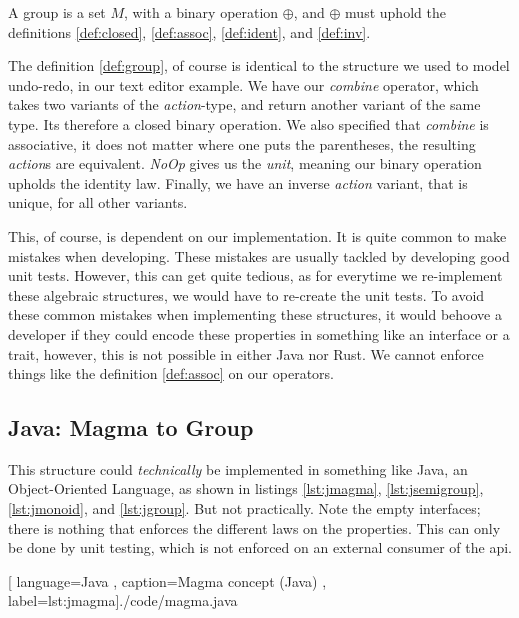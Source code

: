 \begin{definition}[Group] \label{def:group}
  A group is a set $M$, with a binary operation $\oplus$, and $\oplus$ must
  uphold the definitions \ref{def:closed}, \ref{def:assoc}, \ref{def:ident},
  and \ref{def:inv}.
\end{definition}

The definition \ref{def:group}, of course is identical to the structure we used
to model undo-redo, in our text editor example. We have our \textit{combine}
operator, which takes two variants of the \textit{action}-type, and return
another variant of the same type. Its therefore a closed binary operation. We
also specified that \textit{combine} is associative, it does not matter where one
puts the parentheses, the resulting \textit{action}s are equivalent.
\textit{NoOp} gives us the \textit{unit}, meaning our binary operation upholds
the identity law. Finally, we have an inverse \textit{action} variant, that is
unique, for all other variants.

This, of course, is dependent on our implementation. It is quite common to make
mistakes when developing. These mistakes are usually tackled by developing good
unit tests. However, this can get quite tedious, as for everytime we re-implement
these algebraic structures, we would have to re-create the unit tests. To avoid
these common mistakes when implementing these structures, it would behoove a
developer if they could encode these properties in something like an interface or
a trait, however, this is not possible in either Java nor Rust. We cannot enforce
things like the definition \ref{def:assoc} on our operators.

\subsection{Java: Magma to Group}

This structure could \textit{technically} be implemented in something like Java,
an Object-Oriented Language, as shown in listings \ref{lst:jmagma},
\ref{lst:jsemigroup}, \ref{lst:jmonoid}, and \ref{lst:jgroup}. But not
practically. Note the empty interfaces; there is nothing that enforces the
different laws on the properties. This can only be done by unit testing, which
is not enforced on an external consumer of the \gls{api}.

\begin{center}
  
    [ language=Java
    , caption={Magma concept (Java)}
    , label=lst:jmagma]{./code/magma.java}
\end{center}

